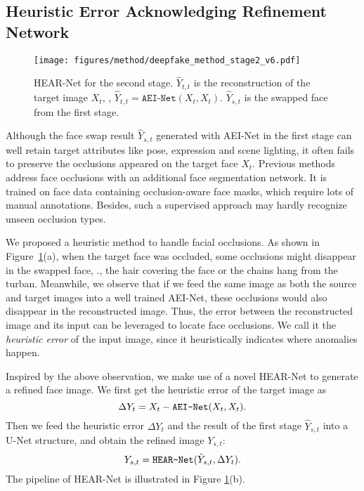 \subsection{Heuristic Error Acknowledging Refinement Network}
\label{sec: error_refine}

\begin{figure}[t]
\centering
 \texttt{[image: figures/method/deepfake\_method\_stage2\_v6.pdf]}
 \footnotesize
    \caption{HEAR-Net for the second stage. $\hat{Y}_{t,t}$ is the reconstruction of the target image $X_t$, \ie, $\hat{Y}_{t,t}=\texttt{AEI-Net}(X_t, X_t)$. $\hat{Y}_{s,t}$ is the swapped face from the first stage.}
\label{fig:framework_stage2}
\end{figure}

Although the face swap result $\hat{Y}_{s,t}$ generated with AEI-Net in the first stage can well retain target attributes like pose, expression and scene lighting, it often fails to preserve the occlusions appeared on the target face $X_t$.
Previous methods \cite{nirkin2018face,nirkin2019fsgan} address face occlusions with an additional face segmentation network. It is trained on face data containing occlusion-aware face masks, which require lots of manual annotations. Besides, such a supervised approach may hardly recognize unseen occlusion types.

We proposed a heuristic method to handle facial occlusions. As shown in Figure~\ref{fig:framework_stage2}(a), when the target face was occluded, some occlusions might disappear in the swapped face, \eg., the hair covering the face or the chains hang from the turban. Meanwhile, we observe that if we feed the same image as both the source and target images into a well trained AEI-Net, these occlusions would also disappear in the reconstructed image. Thus, the error between the reconstructed image and its input can be leveraged to locate face occlusions. We call it the \emph{heuristic error} of the input image, since it heuristically indicates where anomalies happen. 

Inspired by the above observation, we make use of a novel HEAR-Net to generate a refined face image. 
We first get the heuristic error of the target image as
\vspace{-0.5em}
\begin{equation}
\vspace{-0.5em}
\Delta Y_t = X_t - \texttt{AEI-Net}(X_t, X_t).
\end{equation}
Then we feed the heuristic error $\Delta Y_t$ and the result of the first stage $\hat{Y}_{s,t}$ into a U-Net structure, and obtain the refined image $Y_{s,t}$:
\vspace{-0.5em}
\begin{equation}
\vspace{-0.5em}
\label{eqn:Y_s_t}
Y_{s,t} = \texttt{HEAR-Net}(\hat{Y}_{s,t}, \Delta Y_t).
\end{equation}
The pipeline of HEAR-Net is illustrated in Figure \ref{fig:framework_stage2}(b).

